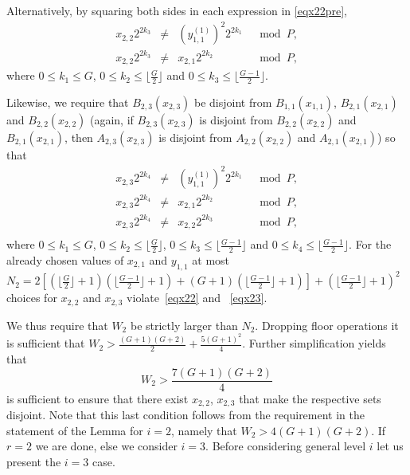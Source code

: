 Alternatively, by squaring both sides in each expression in
\eqref{eqx22pre},
\begin{equation}\label{eqx22}\begin{array}{cccc}
x_{2,2}2^{2k_3} &\neq& (y_{1,1}^{(1)})^2 2^{2k_1} &\mod P, \\
x_{2,2}2^{2k_3} &\neq& x_{2,1} 2^{2k_2} &\mod P,
\end{array}\end{equation}
where $0 \leq k_1 \leq G$, $0 \leq k_2 \leq \lfloor \frac{G}{2}
\rfloor$ and $0 \leq k_3 \leq \lfloor\frac{G-1}{2} \rfloor$.

Likewise, we require that $B_{2,3}(x_{2,3})$ be disjoint from
$B_{1,1}(x_{1,1})$, $B_{2,1}(x_{2,1})$ and  $B_{2,2}(x_{2,2})$
(again, if $B_{2,3}(x_{2,3})$ is disjoint from $B_{2,2}(x_{2,2})$
and $B_{2,1}(x_{2,1})$, then $A_{2,3}(x_{2,3})$ is disjoint from
$A_{2,2}(x_{2,2})$ and $A_{2,1}(x_{2,1})$) so that
\begin{equation}\label{eqx23}\begin{array}{cccc}
x_{2,3}2^{2k_4} &\neq& (y_{1,1}^{(1)})^2 2^{2k_1} &\mod P, \\
x_{2,3}2^{2k_4} &\neq& x_{2,1} 2^{2k_2} &\mod P, \\
x_{2,3}2^{2k_4} &\neq& x_{2,2} 2^{2k_3} &\mod P, \\
\end{array}\end{equation}
where $0 \leq k_1 \leq G$, $0 \leq k_2 \leq \lfloor \frac{G}{2}
\rfloor$, $0 \leq k_3 \leq \lfloor\frac{G-1}{2} \rfloor$ and $0 \leq
k_4 \leq \lfloor\frac{G-1}{2} \rfloor$. For the already chosen
values of $x_{2,1}$ and $y_{1,1}$ at most $N_2= 2\left[
\left(\lfloor \frac{G}{2} \rfloor +1 \right)\left(\lfloor
\frac{G-1}{2} \rfloor +1 \right)+ \left( G+1 \right)\left(\lfloor
\frac{G-1}{2} \rfloor +1 \right)\right]+\left( \lfloor \frac{G-1}{2}
\rfloor +1 \right)^2  $ choices for $x_{2,2}$ and $x_{2,3}$
violate~\eqref{eqx22} and ~\eqref{eqx23}.

We thus require that $W_2$ be strictly larger than $N_2$. Dropping
floor operations it is sufficient that $W_2 > \frac{(G+1)(G+2)}{2} +
\frac{5(G+1)^2}{4}$. Further  simplification yields that
\begin{equation}
W_2 > \frac{7(G+1)(G+2)}{4}
\end{equation}
is sufficient to ensure that there exist $x_{2,2}$, $x_{2,3}$ that
make the respective sets disjoint. Note that this last condition
follows from the requirement in the statement of the Lemma for
$i=2$, namely that $W_2 > 4(G+1)(G+2)$. If $r=2$ we are done, else
we consider $i=3$. Before considering general level $i$ let us
present the $i=3$ case.

